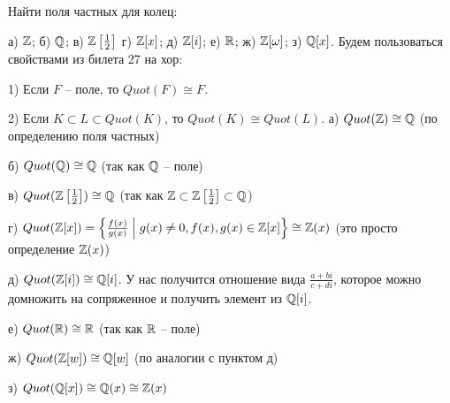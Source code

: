 Найти поля частных для колец:

а) $\mathbb{Z}$; \;\;
б) $\mathbb{Q}$; \;\;
в) $\mathbb{Z} \left[\frac{1}{2}\right]$\;\;
г) $\mathbb{Z}[x]$;\;\;
д) $\mathbb{Z}[i]$;\;\;
е) $\mathbb{R}$;\;\;
ж) $\mathbb{Z}[\omega]$;\;\;
з) $\mathbb{Q}[x]$.
\bigbreak
Будем пользоваться свойствами из билета 27 на хор:

1) Если $F$ -- поле, то $Quot(F) \cong F$.

2) Если $K \subset L \subset Quot(K)$, то $Quot(K) \cong Quot(L)$.
\bigbreak
а) $Quot(\mathbb{Z}) \cong \mathbb{Q}$ \;\; (по определению поля частных)

б) $Quot(\mathbb{Q}) \cong \mathbb{Q}$ \quad(так как $\mathbb{Q}$ -- поле)

в) $Quot(\mathbb{Z} \left[ \frac{1}{2} \right]) \cong \mathbb{Q}$ \quad
(так как $\mathbb{Z} \subset \mathbb{Z} \left[ \frac{1}{2} \right] \subset \mathbb{Q}$)

г) $Quot(\mathbb{Z}[x]) = \left\{ \frac{f(x)}{g(x)} \;\Big| \; 
g(x) \neq 0, f(x), g(x) \in \mathbb{Z}[x] \right\} \cong \mathbb{Z}(x)$ \quad
(это просто определение $\mathbb{Z}(x)$)

д) $Quot(\mathbb{Z}[i]) \cong \mathbb{Q}[i]$.\;\; У нас получится отношение вида
$\frac{a + bi}{c + di}$, которое можно домножить на сопряженное и получить
элемент из $\mathbb{Q}[i]$.

е) $Quot(\mathbb{R}) \cong \mathbb{R}$ \quad(так как $\mathbb{R}$ -- поле)

ж) $Quot(\mathbb{Z}[w]) \cong \mathbb{Q}[w]$ \quad(по аналогии с пунктом д)

з) $Quot(\mathbb{Q}[x]) \cong \mathbb{Q}(x) \cong \mathbb{Z}(x)$